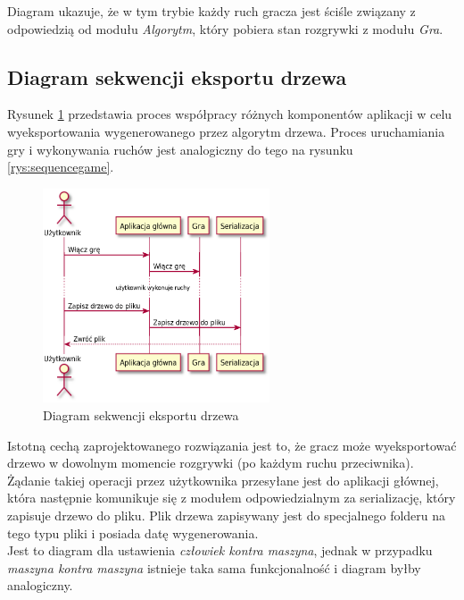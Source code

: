 \documentclass{article}
\newcommand{\modulename}[1]{\textit{#1}}
\begin{document}
	\noindent Diagram ukazuje, że w tym trybie każdy ruch gracza jest ściśle związany z odpowiedzią od modułu \modulename{Algorytm}, który pobiera stan rozgrywki z modułu \modulename{Gra}.
	
	\clearpage
	\subsection{Diagram sekwencji eksportu drzewa}
	Rysunek \ref{rys:sequenceserialize} przedstawia proces współpracy różnych komponentów aplikacji w celu wyeksportowania wygenerowanego przez algorytm drzewa. Proces uruchamiania gry i wykonywania ruchów jest analogiczny do tego na rysunku \ref{rys:sequencegame}. 
	\begin{figure}[h]
		\centering
		\includegraphics[width=0.6\textwidth]{serialize_sequence_simplified}
		\caption{Diagram sekwencji eksportu drzewa}
		\label{rys:sequenceserialize}
	\end{figure}

	\noindent Istotną cechą zaprojektowanego rozwiązania jest to, że gracz może wyeksportować drzewo w dowolnym momencie rozgrywki (po każdym ruchu przeciwnika). Żądanie takiej operacji przez użytkownika przesyłane jest do aplikacji głównej, która następnie komunikuje się z modułem odpowiedzialnym za serializację, który zapisuje drzewo do pliku. Plik drzewa zapisywany jest do specjalnego folderu na tego typu pliki i posiada datę wygenerowania.\\
	
	\noindent Jest to diagram dla ustawienia \modulename{człowiek kontra maszyna}, jednak w przypadku \modulename{maszyna kontra maszyna} istnieje taka sama funkcjonalność i diagram byłby analogiczny.
	
	\clearpage
\end{document}
